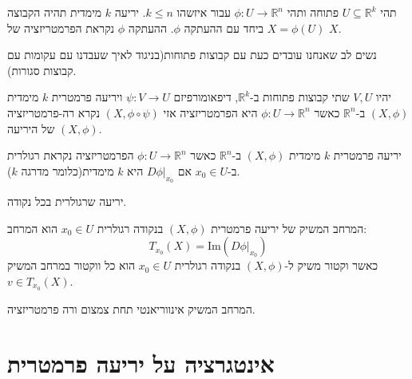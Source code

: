 \documentclass{tstextbook}
\begin{document}
\begin{definition}
תהי \(U\subseteq \mathbb{R}^{k}\) פתוחה ותהי \(\phi:U\to \mathbb{R}^{n}\) עבור איזשהו \(k\leq n\). יריעה \(k\) מימדית תהיה הקבוצה \(X=\phi(U)\) ביחד עם ההעתקה \(\phi\). ההעתקה \(\phi\) נקראת הפרמטריזציה של \(X\).

\end{definition}
\begin{remark}
נשים לב שאנחנו עובדים כעת עם קבוצות פתוחות(בניגוד לאיך שעבדנו עם עקומות עם קבוצות סגורות).

\end{remark}
\begin{definition}[רה-פרמטריזציה]
יהיו \(V,U\) שתי קבוצות פתוחות ב-\(\mathbb{R}^{k}\), דיפאומורפיזם \(\psi:V\to U\) ויריעה פרמטרית \(k\) מימדית \((X,\phi)\) ב-\(\mathbb{R}^{n}\) כאשר \(\phi:U\to \mathbb{R}^{n}\) היא הפרמטריזציה אזי \((X,\phi \circ\psi)\) נקרא רה-פרמטריזציה של היריעה \((X,\phi)\).

\end{definition}
\begin{definition}
יריעה פרמטרית \(k\) מימדית \((X,\phi)\) ב-\(\mathbb{R}^{n}\) כאשר \(\phi:U\to \mathbb{R}^{n}\) הפרמטריזציה נקראת רגולרית ב-\(x_{0} \in U\) אם \(D\phi|_{x_{0}}\) היא \(k\) מימדית(כלומר מדרגה \(k\)).

\end{definition}
\begin{definition}
יריעה שרגולרית בכל נקודה.

\end{definition}
\begin{definition}
המרחב המשיק של יריעה פרמטרית \((X,\phi)\) בנקודה רגולרית \(x_{0} \in U\) הוא המרחב:
$$T_{x_{0}}(X)=\mathrm{Im}(D\phi|_{x_{0}})$$
כאשר וקטור משיק ל-\((X,\phi)\) בנקודה רגולרית \(x_{0} \in U\) הוא כל ווקטור במרחב המשיק \(v \in T_{x_{0}}(X)\).

\end{definition}
\begin{proposition}
המרחב המשיק אינווריאנטי תחת צמצום ורה פרמטריזציה.

\end{proposition}
\section{אינטגרציה על יריעה פרמטרית}
\end{document}
